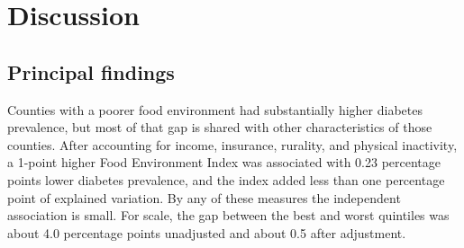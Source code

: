 \documentclass[12pt]{article}
\begin{document}
\begin{table}[H]
\centering\footnotesize
\caption{Sensitivity analyses: coefficient for the Food Environment Index (percentage points of diabetes prevalence per 1-point higher index, unless noted; 95\% confidence interval) and model $R^2$. SEs = standard errors; FEI = Food Environment Index. Source: author analysis of County Health Rankings \& Roadmaps data.}
\end{table}

\section*{Discussion}
\subsection*{Principal findings}
Counties with a poorer food environment had substantially higher diabetes prevalence, but most of that gap is shared with other characteristics of those counties. After accounting for income, insurance, rurality, and physical inactivity, a 1-point higher Food Environment Index was associated with 0.23 percentage points lower diabetes prevalence, and the index added less than one percentage point of explained variation. By any of these measures the independent association is small. For scale, the gap between the best and worst quintiles was about 4.0 percentage points unadjusted and about 0.5 after adjustment.
\end{document}
